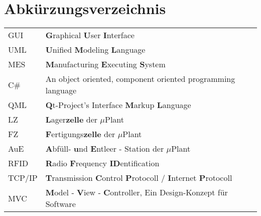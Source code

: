 \chapter*{Abkürzungsverzeichnis}

\begin{center}
	
	\renewcommand{\arraystretch}{1.1}
	
	\begin{supertabular}{p{2.1cm}p{10.9cm}}
		GUI				& \textbf{G}raphical \textbf{U}ser \textbf{I}nterface \\
		UML				& \textbf{U}nified \textbf{M}odeling \textbf{L}anguage \\
		MES				& \textbf{M}anufacturing \textbf{E}xecuting \textbf{S}ystem\\
		C\#				& An object oriented, component oriented programming language\\
		QML				& \textbf{Q}t-Project's Interface \textbf{M}arkup \textbf{L}anguage\\
		LZ				& \textbf{L}ager\textbf{zelle} der $\mu$Plant\\
		FZ				& \textbf{F}ertigungs\textbf{zelle} der $\mu$Plant \\
		AuE				& \textbf{A}bfüll- \textbf{u}nd \textbf{E}ntleer - Station der $\mu$Plant \\
		RFID			& \textbf{R}adio \textbf{F}requency \textbf{ID}entification\\
		TCP/IP			& \textbf{T}ransmission \textbf{C}ontrol \textbf{P}rotocoll / \textbf{I}nternet \textbf{P}rotocoll\\
		MVC				& \textbf{M}odel - \textbf{V}iew - \textbf{C}ontroller, Ein Design-Konzept für Software\\
	\end{supertabular}

\end{center}